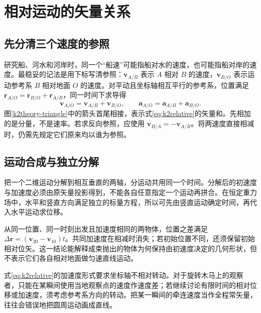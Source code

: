 \section{相对运动的矢量关系}
\subsection{先分清三个速度的参照}
研究船、河水和河岸时，同一个“船速”可能指船对水的速度，也可能指船对岸的速度。最稳妥的记法是用下标写清参照：$\bm v_{A/B}$ 表示 $A$ 相对 $B$ 的速度，$\bm v_{B/O}$ 表示运动参考系 $B$ 相对地面 $O$ 的速度。对平动且坐标轴相互平行的参考系，位置满足 $\bm r_{A/O}=\bm r_{B/O}+\bm r_{A/B}$，同一时间下求导得
\begin{equation}\bm v_{A/O}=\bm v_{A/B}+\bm v_{B/O},\qquad \bm a_{A/O}=\bm a_{A/B}+\bm a_{B/O}.\label{eq:k2relative}\end{equation}
图\ref{k2theory-triangle}中的箭头首尾相接，表示式\eqref{eq:k2relative}的矢量和。先相加的是分量，不是速率。若求反向参照，应使用 $\bm v_{B/A}=-\bm v_{A/B}$。将两速度直接相减时，仍需先规定它们原来均以谁为参照。

\subsection{运动合成与独立分解}
把一个二维运动分解到相互垂直的两轴，分运动共用同一个时间。分解后的初速度与加速度必须由原矢量投影得到，不能各自任意指定一个运动再拼合。在恒定重力场中，水平和竖直方向满足独立的标量方程，所以可先由竖直运动确定时间，再代入水平运动求位移。

从同一位置、同一时刻出发且加速度相同的两物体，位置之差满足 $\Delta\bm r=(\bm v_{20}-\bm v_{10})t$。共同加速度在相减时消失；若初始位置不同，还须保留初始相对位矢。这一结论能解释成束抛出的物体为何保持由初速度决定的几何形状，但不表示它们各自相对地面做匀速直线运动。

式\eqref{eq:k2relative}的加速度形式要求坐标轴不相对转动。对于旋转木马上的观察者，只能在某瞬间使用当地观察点的速度作速度差；若继续讨论有限时间的相对位移或加速度，须考虑参考系方向的转动。把某一瞬间的牵连速度当作全程常矢量，往往会错误地把圆周运动画成直线。


